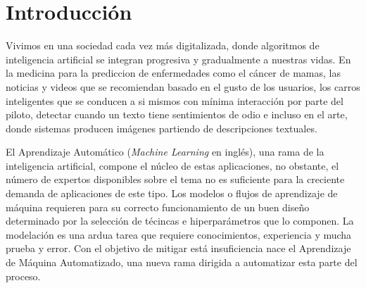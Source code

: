 \chapter*{Introducción}\label{chapter:introduction}
Vivimos en una sociedad cada vez m\'as digitalizada, donde algoritmos de inteligencia artificial se integran progresiva y gradualmente a nuestras vidas. En la medicina para la prediccion de enfermedades como el c\'ancer de mamas, las noticias y videos que se recomiendan basado en el gusto de los usuarios, los carros inteligentes que se conducen a si mismos con m\'inima interacci\'on por parte del piloto, detectar cuando un texto tiene sentimientos de odio e incluso en el arte, donde sistemas producen im\'agenes partiendo de descripciones textuales.

El Aprendizaje Autom\'atico (\textit{Machine Learning} en ingl\'es), una rama de la inteligencia artificial, compone el n\'ucleo de estas aplicaciones, no obstante, el n\'umero de expertos disponibles sobre el tema no es suficiente para la creciente demanda de aplicaciones de este tipo. Los modelos o flujos de aprendizaje de m\'aquina requieren para su correcto funcionamiento de un buen dise\~no determinado por la selecci\'on de t\'ecincas e hiperpar\'ametros que lo componen. La modelaci\'on  es una ardua tarea que requiere conocimientos, experiencia y mucha prueba y error. Con el objetivo de mitigar est\'a insuficiencia nace el Aprendizaje de M\'aquina Automatizado, una nueva rama dirigida a automatizar esta parte del proceso.

